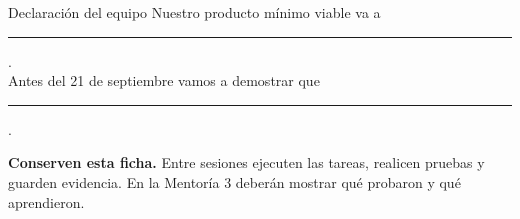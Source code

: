 \documentclass[10pt,a4paper]{article}
\begin{document}
\begin{accentfield}[height=42mm]{Declaración del equipo}
Nuestro producto mínimo viable va a \rule{91mm}{0.35pt}.\\[5mm]
Antes del 21 de septiembre vamos a demostrar que \rule{77mm}{0.35pt}.
\end{accentfield}

\begin{tcolorbox}[colback=AIEPSoft,colframe=AIEPRed,boxrule=0.7pt,arc=1mm,left=3mm,right=3mm,top=2mm,bottom=2mm]
\textbf{Conserven esta ficha.} Entre sesiones ejecuten las tareas, realicen pruebas y guarden evidencia. En la Mentoría 3 deberán mostrar qué probaron y qué aprendieron.
\end{tcolorbox}
\end{document}

